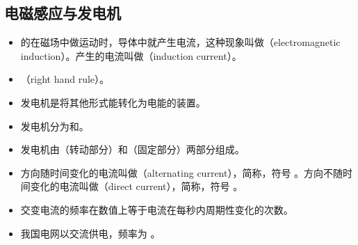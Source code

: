 \subsection{电磁感应与发电机}
\begin{itemize}
\item {}的在磁场中做运动时，导体中就产生电流，这种现象叫做（electromagnetic induction）。产生的电流叫做（induction current）。
\item {}（right hand rule）。
\item 发电机是将其他形式能转化为电能的装置。
\item 发电机分为和。
\item 发电机由（转动部分）和（固定部分）两部分组成。
\item 方向随时间变化的电流叫做（alternating current），简称，符号 。方向不随时间变化的电流叫做（direct current），简称，符号 。
\item 交变电流的频率在数值上等于电流在每秒内周期性变化的次数。
\item 我国电网以交流供电，频率为 。
\end{itemize}